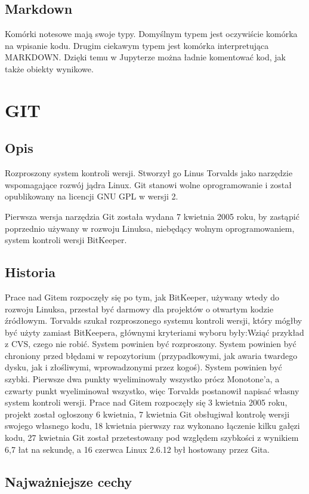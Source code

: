 \documentclass{article}
\begin{document}
\subsection{Markdown}
Komórki notesowe mają swoje typy. Domyślnym typem jest oczywiście komórka na wpisanie kodu. Drugim ciekawym typem jest komórka interpretująca MARKDOWN. Dzięki temu w Jupyterze można ładnie komentować kod, jak także obiekty wynikowe.
\newpage
\section{GIT}
\subsection{Opis}
Rozproszony system kontroli wersji. Stworzył go Linus Torvalds jako narzędzie wspomagające rozwój jądra Linux. Git stanowi wolne oprogramowanie i został opublikowany na licencji GNU GPL w wersji 2.

Pierwsza wersja narzędzia Git została wydana 7 kwietnia 2005 roku, by zastąpić poprzednio używany w rozwoju Linuksa, niebędący wolnym oprogramowaniem, system kontroli wersji BitKeeper.
\subsection{Historia}
Prace nad Gitem rozpoczęły się po tym, jak BitKeeper, używany wtedy do rozwoju Linuksa, przestał być darmowy dla projektów o otwartym kodzie źródłowym. Torvalds szukał rozproszonego systemu kontroli wersji, który mógłby być użyty zamiast BitKeepera, głównymi kryteriami wyboru były:Wziąć przykład z CVS, czego nie robić. System powinien być rozproszony.
System powinien być chroniony przed błędami w repozytorium (przypadkowymi, jak awaria twardego dysku, jak i złośliwymi, wprowadzonymi przez kogoś).
System powinien być szybki. Pierwsze dwa punkty wyeliminowały wszystko prócz Monotone'a, a czwarty punkt wyeliminował wszystko, więc Torvalds postanowił napisać własny system kontroli wersji.
Prace nad Gitem rozpoczęły się 3 kwietnia 2005 roku, projekt został ogłoszony 6 kwietnia, 7 kwietnia Git obsługiwał kontrolę wersji swojego własnego kodu, 18 kwietnia pierwszy raz wykonano łączenie kilku gałęzi kodu, 27 kwietnia Git został przetestowany pod względem szybkości z wynikiem 6,7 łat na sekundę, a 16 czerwca Linux 2.6.12 był hostowany przez Gita.
\subsection{Najważniejsze cechy}
\end{document}
